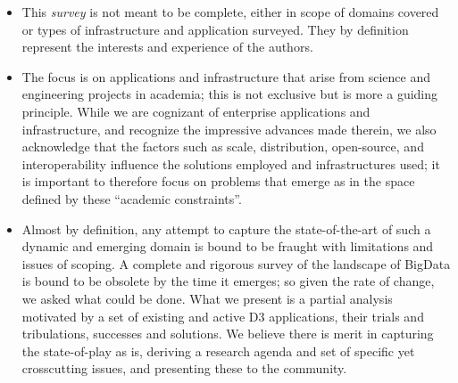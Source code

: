 \begin{itemize}

\item This {\it survey} is not meant to be complete, either in scope
  of domains covered or types of infrastructure and application
  surveyed.  They by definition represent the interests and experience
  of the authors.

\item The focus is on applications and infrastructure that arise from
  science and engineering projects in academia; this is not exclusive
  but is more a guiding principle.  While we are cognizant of
  enterprise applications and infrastructure, and recognize the
  impressive advances made therein, we also acknowledge that the
  factors such as scale, distribution, open-source, and
  interoperability influence the solutions employed and infrastructures
  used; it is important to therefore focus on problems that emerge as
  in the space defined by these ``academic constraints''.

\item Almost by definition, any attempt to capture the
  state-of-the-art of such a dynamic and emerging domain is bound to
  be fraught with limitations and issues of scoping.  A complete and
  rigorous survey of the landscape of BigData is bound to be obsolete
  by the time it emerges; so given the rate of change, we asked what
  could be done. What we present is a partial analysis motivated by a
  set of existing and active D3 applications, their trials and
  tribulations, successes and solutions. We believe there is merit in
  capturing the state-of-play as is, deriving a research agenda
  and set of specific yet crosscutting issues, and presenting these
  to the community.
\end{itemize}





%

